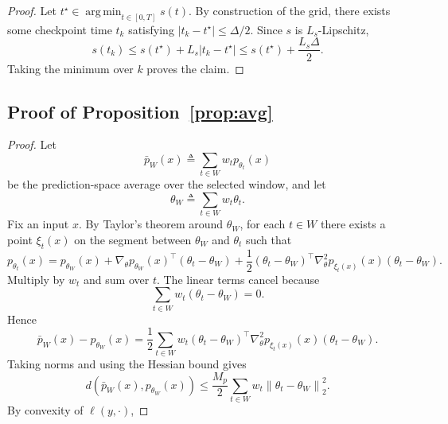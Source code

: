 \documentclass{article}
\newcommand{\argmin}{\operatorname*{arg\,min}}
\newcommand{\norm}[1]{\left\lVert #1 \right\rVert}
\begin{document}
\begin{proof}
Let $t^\star\in\argmin_{t\in[0,T]} s(t)$. By construction of the grid, there exists some checkpoint time $t_k$ satisfying $|t_k-t^\star|\le \Delta/2$. Since $s$ is $L_s$-Lipschitz,
\begin{equation}
    s(t_k)
    \le
    s(t^\star) + L_s|t_k-t^\star|
    \le
    s(t^\star) + \frac{L_s\Delta}{2}.
\end{equation}
Taking the minimum over $k$ proves the claim.
\end{proof}

\subsection{Proof of Proposition~\ref{prop:avg}}

\begin{proof}
Let
\begin{equation}
    \bar p_W(x) \triangleq \sum_{t\in W} w_t p_{\theta_t}(x)
\end{equation}
be the prediction-space average over the selected window, and let
\begin{equation}
    \theta_W \triangleq \sum_{t\in W} w_t \theta_t.
\end{equation}
Fix an input $x$. By Taylor's theorem around $\theta_W$, for each $t\in W$ there exists a point $\xi_t(x)$ on the segment between $\theta_W$ and $\theta_t$ such that
\begin{equation}
    p_{\theta_t}(x)
    =
    p_{\theta_W}(x)
    +
    \nabla_\theta p_{\theta_W}(x)^\top (\theta_t-\theta_W)
    +
    \frac{1}{2}(\theta_t-\theta_W)^\top \nabla_\theta^2 p_{\xi_t(x)}(x)(\theta_t-\theta_W).
\end{equation}
Multiply by $w_t$ and sum over $t$. The linear terms cancel because
\begin{equation}
    \sum_{t\in W} w_t (\theta_t-\theta_W) = 0.
\end{equation}
Hence
\begin{equation}
    \bar p_W(x) - p_{\theta_W}(x)
    =
    \frac{1}{2}\sum_{t\in W} w_t
    (\theta_t-\theta_W)^\top \nabla_\theta^2 p_{\xi_t(x)}(x)(\theta_t-\theta_W).
\end{equation}
Taking norms and using the Hessian bound gives
\begin{equation}
    d\!\left(\bar p_W(x), p_{\theta_W}(x)\right)
    \le
    \frac{M_p}{2}\sum_{t\in W} w_t \norm{\theta_t-\theta_W}_2^2.
    \label{eq:avg_local}
\end{equation}
By convexity of $\ell(y,\cdot)$,

\end{proof}
\end{document}

